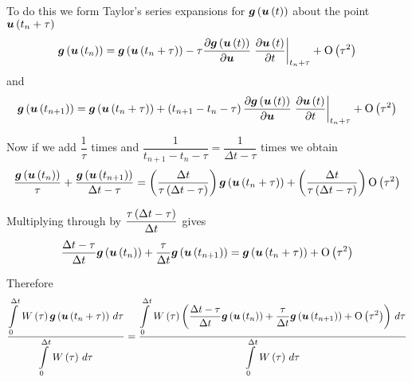 To do this we form Taylor's series expansions for
$ \boldsymbol{g}\left(  \boldsymbol{u}\left( t \right)  \right) $ about the point $ \boldsymbol{u}\left( t_{n}+\tau \right) $ \ie
\begin{equation}
  \fnof{\vectr{g}}{\fnof{\vectr{u}}{t_{n}}}=\fnof{\vectr{g}}{\fnof{\vectr{u}}{t_{n}+\tau}}-
  \tau\delby{\fnof{\vectr{g}}{\fnof{\vectr{u}}{t}}}{\vectr{u}}\evalat{\delby{\fnof{\vectr{u}}{t}}{t}}{t_{n}+\tau}
  + \orderof{\tau^{2}}
  \label{eqn:firstTaylorexpansion}
\end{equation}
and
\begin{equation}
  \fnof{\vectr{g}}{\fnof{\vectr{u}}{t_{n+1}}}=\fnof{\vectr{g}}{\fnof{\vectr{u}}{t_{n}+\tau}}+
  \pbrac{t_{n+1}-t_{n}-\tau}\delby{\fnof{\vectr{g}}{\fnof{\vectr{u}}{t}}}{\vectr{u}}
  \evalat{\delby{\fnof{\vectr{u}}{t}}{t}}{t_{n}+\tau}+ \orderof{\tau^{2}}
  \label{eqn:secondTaylorexpansion}
\end{equation}

Now if we add $\dfrac{1}{\tau}$ times  and
$\dfrac{1}{t_{n+1}-t_{n}-\tau}=\dfrac{1}{\Delta t-\tau}$ times
 we obtain
\begin{equation}
  \dfrac{ \boldsymbol{g}\left(  \boldsymbol{u}\left( t_{n} \right)  \right) }{\tau}+\dfrac{ \boldsymbol{g}\left(  \boldsymbol{u}\left( t_{n+1} \right)  \right) }{\Delta
    t-\tau}=\left( \dfrac{\Delta t}{\tau\left( \Delta t-\tau \right)} \right) \boldsymbol{g}\left(  \boldsymbol{u}\left( t_{n}+\tau \right)  \right) +
  \left( \dfrac{\Delta t}{\tau\left( \Delta t-\tau \right)} \right) \mathrm{O}\left( \tau^{2} \right) 
\end{equation}

Multiplying through by $\dfrac{\tau\left( \Delta t-\tau \right)}{\Delta t}$ gives
\begin{equation}
  \dfrac{\Delta t-\tau}{\Delta t} \boldsymbol{g}\left(  \boldsymbol{u}\left( t_{n} \right)  \right) +
  \dfrac{\tau}{\Delta t} \boldsymbol{g}\left(  \boldsymbol{u}\left( t_{n+1} \right)  \right) =
   \boldsymbol{g}\left(  \boldsymbol{u}\left( t_{n}+\tau \right)  \right) + \mathrm{O}\left( \tau^{2} \right) 
\end{equation}

Therefore
\begin{equation}
  \dfrac{  \displaystyle\int\limits_{0}^{\Delta t} \, W\left( \tau \right)  \boldsymbol{g}\left(  \boldsymbol{u}\left( t_{n}+\tau \right)  \right) \,d\tau }
  {  \displaystyle\int\limits_{0}^{\Delta t} \, W\left( \tau \right) \,d\tau }=\dfrac{  \displaystyle\int\limits_{0}^{\Delta t} \, W\left( \tau \right) 
      \left( \dfrac{\Delta t-\tau}{\Delta t} \boldsymbol{g}\left(  \boldsymbol{u}\left( t_{n} \right)  \right) +
        \dfrac{\tau}{\Delta t} \boldsymbol{g}\left(  \boldsymbol{u}\left( t_{n+1} \right)  \right) + \mathrm{O}\left( \tau^{2} \right)  \right)\,d\tau }
  {  \displaystyle\int\limits_{0}^{\Delta t} \, W\left( \tau \right) \,d\tau }
\end{equation}

